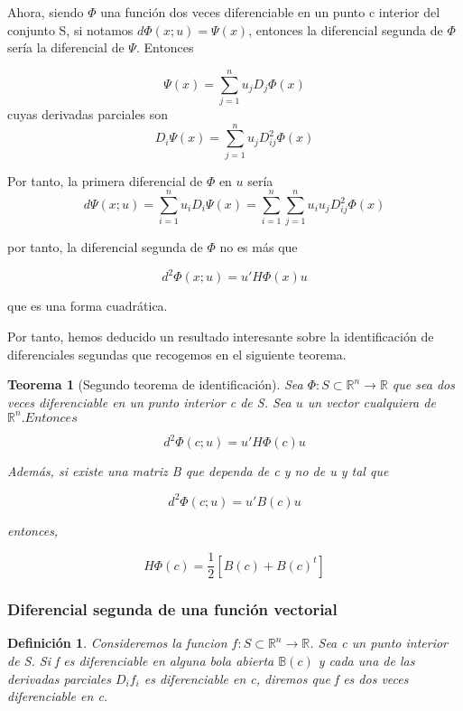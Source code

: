 \documentclass{article}
\theoremstyle{theorem-style}  %
\newtheorem{theorem}{Teorema}[section]  %
\theoremstyle{definition-style}
\newtheorem{definition}{Definición}[section]
\theoremstyle{example-style}
\theoremstyle{exercise-style}
\begin{document}
	Ahora, siendo $\Phi$ una función dos veces diferenciable en un punto c interior del conjunto S, si notamos $d \Phi(x;u) = \Psi(x)$, entonces la diferencial segunda de $\Phi$ sería la diferencial de $\Psi$. Entonces 
	
	$$\Psi (x) = \sum_{j=1}^{n} u_j D_j \Phi(x)$$ cuyas derivadas parciales son $$D_i \Psi(x) = \sum_{j=1}^{n} u_j D_{ij}^2 \Phi(x)$$
	
	Por tanto, la primera diferencial de $\Phi$ en $u$ sería $$d \Psi (x;u) = \sum_{i = 1}^{n} u_i D_i \Psi(x) = \sum_{i = 1}^{n} \sum_{j=1}^{n} u_i u_j D_{ij}^2 \Phi(x)$$
	
	por tanto, la diferencial segunda de $\Phi$ no es más que
	
	$$d^2 \Phi(x;u) = u' H \Phi(x) u$$
	
	que es una forma cuadrática.
	
	Por tanto, hemos deducido un resultado interesante sobre la identificación de diferenciales segundas que recogemos en el siguiente teorema.
	
	\begin{theorem}[Segundo teorema de identificación]
		Sea $\Phi: S \subset \mathbb{R}^n \rightarrow \mathbb{R}$ que sea dos veces diferenciable en un punto interior c de S. Sea $u$ un vector cualquiera de $\mathbb{R}^n. Entonces$
		
		$$d^2 \Phi(c;u) = u' H \Phi(c)u$$
		
		Además, si existe una matriz B que dependa de c y no de u y tal que
		
		$$ d^2 \Phi(c;u) = u' B(c) u $$
		
		entonces, 
		
		$$ H \Phi(c) = \frac{1}{2} [B(c) + B(c)^t]$$
		
	\end{theorem}
	
	
	
	\subsubsection{Diferencial segunda de una función vectorial}
	
	\begin{definition}
		Consideremos la funcion $f: S \subset \mathbb{R}^n \rightarrow \mathbb{R}$. Sea c un punto interior de S. Si f es diferenciable en alguna bola abierta $\mathbb{B}(c)$ y cada una de las derivadas parciales $D_i f_i$ es diferenciable en c, diremos que f es dos veces diferenciable en c.
	\end{definition}
	
\end{document}
